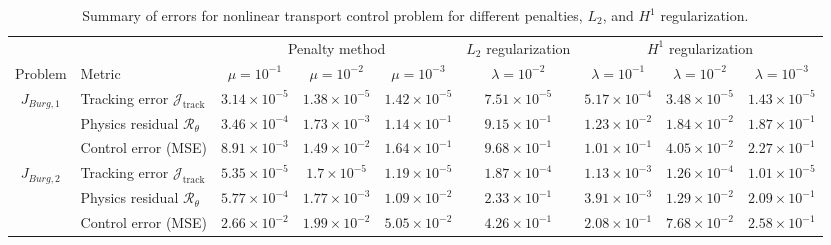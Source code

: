 \documentclass[final,1p,times]{elsarticle}
\theoremstyle{plain} %
\theoremstyle{definition} %
\theoremstyle{remark} %
\begin{document}
\begin{table}[t]
\centering
\scriptsize
\caption{Summary of errors for nonlinear transport control problem for different penalties, $L_2$, and $H^1$ regularization.}
\label{tab:summary_errors_burgers}
\renewcommand{\arraystretch}{1.15}
\setlength{\tabcolsep}{3pt}

\begin{tabular}{c l ccc c ccc}
\toprule
& & \multicolumn{3}{c}{Penalty method} & \multicolumn{1}{c}{$L_2$ regularization} & \multicolumn{3}{c}{$H^1$ regularization} \\
\cmidrule(lr){3-5}\cmidrule(lr){6-6}\cmidrule(lr){7-9}
Problem & Metric & $\mu=10^{-1}$ & $\mu=10^{-2}$ & $\mu=10^{-3}$ & $\lambda=10^{-2}$ & $\lambda=10^{-1}$ & $\lambda=10^{-2}$ & $\lambda=10^{-3}$ \\
\midrule
\multirow{3}{*}{$J_{Burg,1}$} & Tracking error $\mathcal{J}_{\text{track}}$ & $3.14\times 10^{-5}$ & $1.38\times 10^{-5}$ & $1.42\times 10^{-5}$ & $7.51\times 10^{-5}$ & $5.17\times 10^{-4}$ & $3.48\times 10^{-5}$ & $1.43\times 10^{-5}$ \\
 & Physics residual $\mathcal{R}_\theta$ & $3.46\times 10^{-4}$ & $1.73\times 10^{-3}$ & $1.14\times 10^{-1}$ & $9.15\times 10^{-1}$ & $1.23\times 10^{-2}$ & $1.84\times 10^{-2}$ & $1.87\times 10^{-1}$ \\
 & Control error (MSE) & $8.91\times 10^{-3}$ & $1.49\times 10^{-2}$ & $1.64\times 10^{-1}$ & $9.68\times 10^{-1}$ & $1.01\times 10^{-1}$ & $4.05\times 10^{-2}$ & $2.27\times 10^{-1}$ \\
\midrule
\multirow{3}{*}{$J_{Burg,2}$} & Tracking error $\mathcal{J}_{\text{track}}$ & $5.35\times 10^{-5}$ & $1.7\times 10^{-5}$ & $1.19\times 10^{-5}$ & $1.87\times 10^{-4}$ & $1.13\times 10^{-3}$ & $1.26\times 10^{-4}$ & $1.01\times 10^{-5}$ \\
 & Physics residual $\mathcal{R}_\theta$ & $5.77\times 10^{-4}$ & $1.77\times 10^{-3}$ & $1.09\times 10^{-2}$ & $2.33\times 10^{-1}$ & $3.91\times 10^{-3}$ & $1.29\times 10^{-2}$ & $2.09\times 10^{-1}$ \\
 & Control error (MSE) & $2.66\times 10^{-2}$ & $1.99\times 10^{-2}$ & $5.05\times 10^{-2}$ & $4.26\times 10^{-1}$ & $2.08\times 10^{-1}$ & $7.68\times 10^{-2}$ & $2.58\times 10^{-1}$ \\
\bottomrule
\end{tabular}
\end{table}


\end{document}
